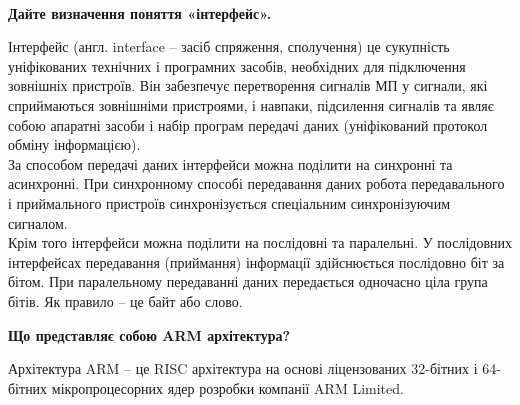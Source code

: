 \documentclass[a4paper,14pt]{extreport}
\begin{document}
\begin{center} $\quad$ \end{center}

\begin{tcolorbox}[colback=blue!5!white!100,colframe=blue!75!black!90,width=19cm,righttitle=0.5cm, 
title= \center{\Large{\textbf{1}}}]
\begin{center}\bf{Дайте визначення поняття «інтерфейс».}\end{center}
\tcblower
Інтерфейс (англ. interface – засіб спряження, сполучення) це сукупність уніфікованих технічних і програмних засобів, необхідних для підключення зовнішніх пристроїв. Він забезпечує перетворення сигналів МП у сигнали, які сприймаються зовнішніми пристроями, і навпаки, підсилення сигналів та
являє собою апаратні засоби і набір програм передачі даних (уніфікований протокол обміну інформацією).\\

За способом передачі даних інтерфейси можна поділити на синхронні та асинхронні. При синхронному способі передавання даних робота передавального і приймального пристроїв синхронізується спеціальним синхронізуючим сигналом.\\ 

Крім того інтерфейси можна поділити на послідовні та паралельні. У послідовних інтерфейсах передавання (приймання) інформації здійснюється послідовно біт за бітом. При паралельному передаванні даних передається одночасно ціла група бітів. Як правило – це байт або слово.
\end{tcolorbox}


\begin{tcolorbox}[colback=orange!5!white!100,colframe=orange!75!black!90,width=19cm,righttitle=0.5cm,
title= \center{\Large{\textbf{2}}}]
\begin{center}\bf{Що представляє собою ARM архітектура?}\end{center}
\tcblower
Архітектура ARM – це RISC архітектура на основі
ліцензованих 32-бітних і 64-бітних мікропроцесорних ядер розробки компанії ARM Limited.
\end{tcolorbox}
\end{document}
